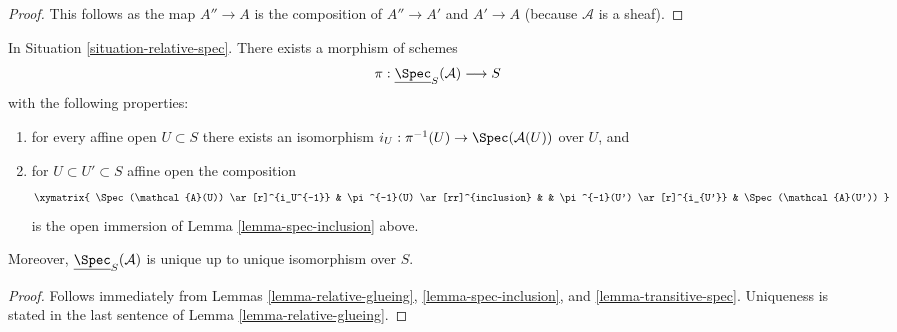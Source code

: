\begin{proof}
This follows as the map $A'' \to A$ is the composition of $A'' \to A'$ and
$A' \to A$ (because $\mathcal{A}$ is a sheaf).
\end{proof}

\begin{lemma}
\label{lemma-glue-relative-spec}
In Situation \ref{situation-relative-spec}.
There exists a morphism of schemes
$$
\pi : \underline{\Spec}_S(\mathcal{A}) \longrightarrow S
$$
with the following properties:
\begin{enumerate}
\item for every affine open $U \subset S$ there exists an isomorphism
$i_U : \pi^{-1}(U) \to \Spec(\mathcal{A}(U))$ over $U$, and
\item for $U \subset U' \subset S$ affine open the composition
$$
\xymatrix{
\Spec(\mathcal{A}(U)) \ar[r]^{i_U^{-1}} &
\pi^{-1}(U) \ar[rr]^{inclusion} & &
\pi^{-1}(U') \ar[r]^{i_{U'}} &
\Spec(\mathcal{A}(U'))
}
$$
is the open immersion of Lemma \ref{lemma-spec-inclusion} above.
\end{enumerate}
Moreover, $\underline{\Spec}_S(\mathcal{A})$
is unique up to unique isomorphism over $S$.
\end{lemma}

\begin{proof}
Follows immediately from
Lemmas \ref{lemma-relative-glueing},
\ref{lemma-spec-inclusion}, and
\ref{lemma-transitive-spec}.
Uniqueness is stated in the last sentence of
Lemma \ref{lemma-relative-glueing}.
\end{proof}












